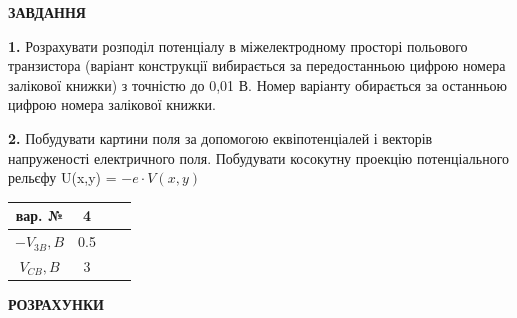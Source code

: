 \documentclass[14pt,a4paper]{scrartcl}
\begin{document}
 

\begin{center}
\textbf{ЗАВДАННЯ} \\
\end{center}

\textbf{1.} Розрахувати розподіл потенціалу в міжелектродному просторі польового транзистора (варіант конструкції вибирається за передостанньою цифрою номера залікової книжки) з точністю до 0,01 В. Номер варіанту обирається за останньою цифрою номера залікової книжки.\par

\textbf{2.} Побудувати картини поля за допомогою еквіпотенціалей і векторів напруженості електричного поля. Побудувати косокутну проекцію потенціального рельєфу U(x,y) = $-e\cdot V(x,y)$\\
\begin{figure}[h]
\end{figure}

\begin{center}
\vspace{0.1cm}
\begin{Large}
\begin{tabular}{ | c |  c |  c |  c |}
\hline
вар. № & 4   \\ 
\hline
$-V_{3B},B$ & 0.5   \\ 
\hline
$V_{CB}, B$ & 3   \\ 
\hline
\end{tabular}
\end{Large}
\vspace{0.2cm}
\end{center}

\newpage
\begin{center}
\textbf{РОЗРАХУНКИ} \\
\end{center}


\begin{center}
\begin{figure}[h]
\end{figure}
\end{center}
\end{document}
